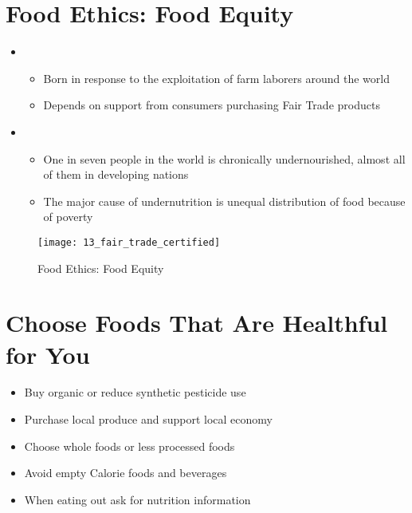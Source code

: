 \documentclass[title={Chapter 13}]{fdsn201notes}
\begin{document}
\section{Food Ethics: Food Equity}\label{sec:food-ethics:-food-equity}
\begin{itemize}
	\item {}
	\begin{itemize}
		\item Born in response to the exploitation of farm laborers around the world
		\item Depends on support from consumers purchasing Fair Trade products
	\end{itemize}
	\item {}
	\begin{itemize}
		\item One in seven people in the world is chronically undernourished, almost all of them in developing nations
		\item The major cause of undernutrition is unequal distribution of food because of poverty
	\end{itemize}
\end{itemize}

\begin{figure}[H]
	\centering
	\texttt{[image: 13\_fair\_trade\_certified]}
	\caption{Food Ethics: Food Equity}
	\label{fig:13_food_ethics_food_equity}
\end{figure}

\section{Choose Foods That Are Healthful for You}\label{sec:choose-foods-that-are-healthful-for-you}
\begin{itemize}
	\item Buy organic or reduce synthetic pesticide use
	\item Purchase local produce and support local economy
	\item Choose whole foods or less processed foods
	\item Avoid empty Calorie foods and beverages
	\item When eating out ask for nutrition information
\end{itemize}
\end{document}
